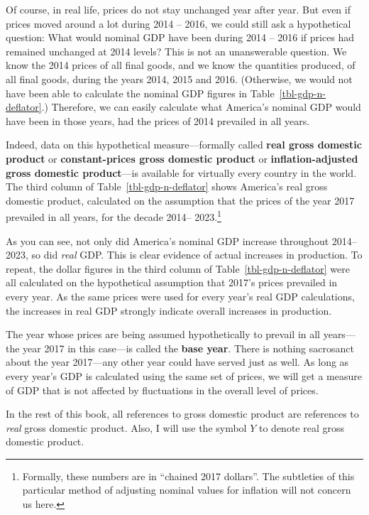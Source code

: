 \documentclass[
  letterpaper,
]{book}
\theoremstyle{plain}
\theoremstyle{remark}
\begin{document}
Of course, in real life, prices do not stay unchanged year after year.
But even if prices moved around a lot during 2014 -- 2016, we could
still ask a hypothetical question: What would nominal GDP have been
during 2014 -- 2016 if prices had remained unchanged at 2014 levels?
This is not an unanswerable question. We know the 2014 prices of all
final goods, and we know the quantities produced, of all final goods,
during the years 2014, 2015 and 2016. (Otherwise, we would not have been
able to calculate the nominal GDP figures in
Table~\ref{tbl-gdp-n-deflator}.) Therefore, we can easily calculate what
America's nominal GDP would have been in those years, had the prices of
2014 prevailed in all years.

Indeed, data on this hypothetical measure---formally called \textbf{real
gross domestic product} or \textbf{constant-prices gross domestic
product} or \textbf{inflation-adjusted gross domestic product}---is
available for virtually every country in the world. The third column of
Table~\ref{tbl-gdp-n-deflator} shows America's real gross domestic
product, calculated on the assumption that the prices of the year 2017
prevailed in all years, for the decade 2014-- 2023.\footnote{Formally,
  these numbers are in ``chained 2017 dollars''. The subtleties of this
  particular method of adjusting nominal values for inflation will not
  concern us here.}

As you can see, not only did America's nominal GDP increase throughout
2014-- 2023, so did \emph{real} GDP. This is clear evidence of actual
increases in production. To repeat, the dollar figures in the third
column of Table~\ref{tbl-gdp-n-deflator} were all calculated on the
hypothetical assumption that 2017's prices prevailed in every year. As
the same prices were used for every year's real GDP calculations, the
increases in real GDP strongly indicate overall increases in production.

The year whose prices are being assumed hypothetically to prevail in all
years---the year 2017 in this case---is called the \textbf{base year}.
There is nothing sacrosanct about the year 2017---any other year could
have served just as well. As long as every year's GDP is calculated
using the same set of prices, we will get a measure of GDP that is not
affected by fluctuations in the overall level of prices.

In the rest of this book, all references to gross domestic product are
references to \emph{real} gross domestic product. Also, I will use the
symbol \(Y\) to denote real gross domestic product.
\end{document}

